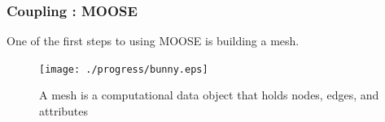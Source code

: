 \begin{frame}[fragile]
  \frametitle{Coupling : MOOSE}
  One of the first steps to using MOOSE is building a mesh.
  \begin{figure}[htbp!]
    \begin{center}
      \texttt{[image: ./progress/bunny.eps]}
    \end{center}
    \caption{A mesh is a computational data object that holds nodes, edges, and 
    attributes}
    \label{fig:radau_stability}
  \end{figure}
\end{frame}


